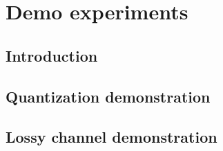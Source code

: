 \chapter{Demo experiments}\label{chapt:demo}

\section{Introduction}

\section{Quantization demonstration}


\section{Lossy channel demonstration}